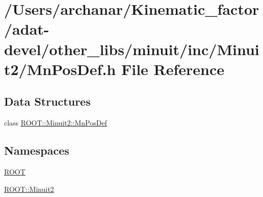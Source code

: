 \hypertarget{adat-devel_2other__libs_2minuit_2inc_2Minuit2_2MnPosDef_8h}{}\section{/\+Users/archanar/\+Kinematic\+\_\+factor/adat-\/devel/other\+\_\+libs/minuit/inc/\+Minuit2/\+Mn\+Pos\+Def.h File Reference}
\label{adat-devel_2other__libs_2minuit_2inc_2Minuit2_2MnPosDef_8h}
\subsection*{Data Structures}
\begin{DoxyCompactItemize}
\item 
class \mbox{\hyperlink{classROOT_1_1Minuit2_1_1MnPosDef}{R\+O\+O\+T\+::\+Minuit2\+::\+Mn\+Pos\+Def}}
\end{DoxyCompactItemize}
\subsection*{Namespaces}
\begin{DoxyCompactItemize}
\item 
 \mbox{\hyperlink{namespaceROOT}{R\+O\+OT}}
\item 
 \mbox{\hyperlink{namespaceROOT_1_1Minuit2}{R\+O\+O\+T\+::\+Minuit2}}
\end{DoxyCompactItemize}
